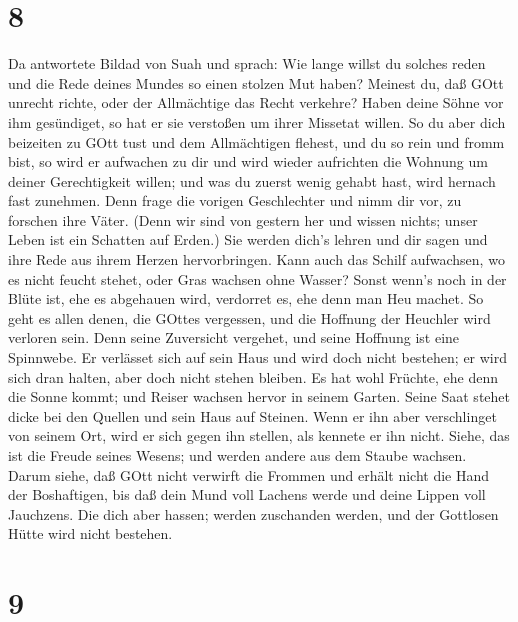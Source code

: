 \hypertarget{section-7}{%
\section{8}\label{section-7}}

 Da antwortete Bildad von Suah und sprach:  Wie
lange willst du solches reden und die Rede deines Mundes so einen
stolzen Mut haben?  Meinest du, daß GOtt unrecht richte,
oder der Allmächtige das Recht verkehre?  Haben deine Söhne
vor ihm gesündiget, so hat er sie verstoßen um ihrer Missetat willen.
 So du aber dich beizeiten zu GOtt tust und dem Allmächtigen
flehest,  und du so rein und fromm bist, so wird er
aufwachen zu dir und wird wieder aufrichten die Wohnung um deiner
Gerechtigkeit willen;  und was du zuerst wenig gehabt hast,
wird hernach fast zunehmen.  Denn frage die vorigen
Geschlechter und nimm dir vor, zu forschen ihre Väter. 
(Denn wir sind von gestern her und wissen nichts; unser Leben ist ein
Schatten auf Erden.)  Sie werden dich's lehren und dir
sagen und ihre Rede aus ihrem Herzen hervorbringen.  Kann
auch das Schilf aufwachsen, wo es nicht feucht stehet, oder Gras wachsen
ohne Wasser?  Sonst wenn's noch in der Blüte ist, ehe es
abgehauen wird, verdorret es, ehe denn man Heu machet.  So
geht es allen denen, die GOttes vergessen, und die Hoffnung der Heuchler
wird verloren sein.  Denn seine Zuversicht vergehet, und
seine Hoffnung ist eine Spinnwebe.  Er verlässet sich auf
sein Haus und wird doch nicht bestehen; er wird sich dran halten, aber
doch nicht stehen bleiben.  Es hat wohl Früchte, ehe denn
die Sonne kommt; und Reiser wachsen hervor in seinem Garten.
 Seine Saat stehet dicke bei den Quellen und sein Haus auf
Steinen.  Wenn er ihn aber verschlinget von seinem Ort,
wird er sich gegen ihn stellen, als kennete er ihn nicht. 
Siehe, das ist die Freude seines Wesens; und werden andere aus dem
Staube wachsen.  Darum siehe, daß GOtt nicht verwirft die
Frommen und erhält nicht die Hand der Boshaftigen,  bis daß
dein Mund voll Lachens werde und deine Lippen voll Jauchzens.
 Die dich aber hassen; werden zuschanden werden, und der
Gottlosen Hütte wird nicht bestehen.

\hypertarget{section-8}{%
\section{9}\label{section-8}}


